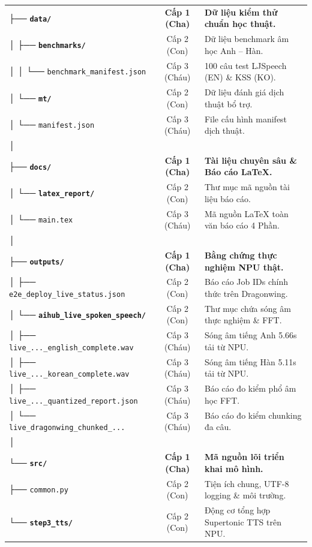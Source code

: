 \documentclass[11pt,a4paper,oneside,table]{report}
\begin{document}
\begin{table}[H]
\begin{tabularx}{\textwidth}{p{7.2cm} c p{6.8cm}}
├── \textbf{\texttt{data/}} & \textbf{Cấp 1 (Cha)} & \textbf{Dữ liệu kiểm thử chuẩn học thuật.} \\
│   ├── \textbf{\texttt{benchmarks/}} & Cấp 2 (Con) & Dữ liệu benchmark âm học Anh -- Hàn. \\
│   │   └── \texttt{benchmark\_manifest.json} & Cấp 3 (Cháu) & 100 câu test LJSpeech (EN) \& KSS (KO). \\
│   └── \textbf{\texttt{mt/}} & Cấp 2 (Con) & Dữ liệu đánh giá dịch thuật bổ trợ. \\
│       └── \texttt{manifest.json} & Cấp 3 (Cháu) & File cấu hình manifest dịch thuật. \\
│ & & \\
├── \textbf{\texttt{docs/}} & \textbf{Cấp 1 (Cha)} & \textbf{Tài liệu chuyên sâu \& Báo cáo LaTeX.} \\
│   └── \textbf{\texttt{latex\_report/}} & Cấp 2 (Con) & Thư mục mã nguồn tài liệu báo cáo. \\
│       └── \texttt{main.tex} & Cấp 3 (Cháu) & Mã nguồn LaTeX toàn văn báo cáo 4 Phần. \\
│ & & \\
├── \textbf{\texttt{outputs/}} & \textbf{Cấp 1 (Cha)} & \textbf{Bằng chứng thực nghiệm NPU thật.} \\
│   ├── \texttt{e2e\_deploy\_live\_status.json} & Cấp 2 (Con) & Báo cáo Job IDs chính thức trên Dragonwing. \\
│   └── \textbf{\texttt{aihub\_live\_spoken\_speech/}} & Cấp 2 (Con) & Thư mục chứa sóng âm thực nghiệm \& FFT. \\
│       ├── \texttt{live\_...\_english\_complete.wav} & Cấp 3 (Cháu) & Sóng âm tiếng Anh 5.66s tải từ NPU. \\
│       ├── \texttt{live\_...\_korean\_complete.wav} & Cấp 3 (Cháu) & Sóng âm tiếng Hàn 5.11s tải từ NPU. \\
│       ├── \texttt{live\_...\_quantized\_report.json}& Cấp 3 (Cháu) & Báo cáo đo kiểm phổ âm học FFT. \\
│       └── \texttt{live\_dragonwing\_chunked\_...} & Cấp 3 (Cháu) & Báo cáo đo kiểm chunking đa câu. \\
│ & & \\
└── \textbf{\texttt{src/}} & \textbf{Cấp 1 (Cha)} & \textbf{Mã nguồn lõi triển khai mô hình.} \\
    ├── \texttt{common.py} & Cấp 2 (Con) & Tiện ích chung, UTF-8 logging \& môi trường. \\
    └── \textbf{\texttt{step3\_tts/}} & Cấp 2 (Con) & Động cơ tổng hợp Supertonic TTS trên NPU. \\

\end{tabularx}
\end{table}
\end{document}
